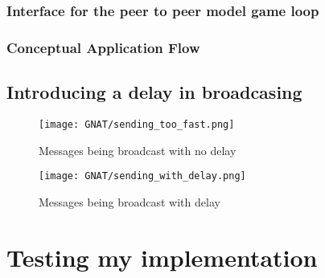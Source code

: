 \newpage
\subsubsection{Interface for the peer to peer model game loop}




\newpage
\subsubsection{Conceptual Application Flow}

\subsection{Introducing a delay in broadcasing}
\newpage
\vfill
\begin{figure}[!h]
  \centering
  \texttt{[image: GNAT/sending\_too\_fast.png]}
  \caption{Messages being broadcast with no delay}
  \label{fig:broadcast_too_fast}
\end{figure}

\begin{figure}[!h]
  \centering
  \texttt{[image: GNAT/sending\_with\_delay.png]}
  \caption{Messages being broadcast with delay}
  \label{fig:broadcast_with_delay}
\end{figure}
\vfill
\newpage

\section{Testing my implementation}
